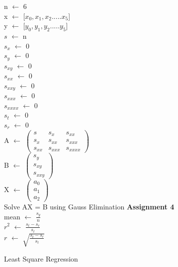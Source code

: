 \documentclass[titlepage, 11pt]{article}
\begin{document}
\begin{center}
\begin{algorithm}[H]\label{alg5}
\SetAlgoLined
{
n $\gets$ 6 \\
x $\gets$ [$x_0,x_1,x_2.....x_{5}$] \\
y $\gets$ [$y_0,y_1,y_2.....y_{5}$] \\
$s$ $\gets$ n \\
$s_x$ $\gets$ 0 \\ 
$s_y$ $\gets$ 0 \\ 
$s_{xy}$ $\gets$ 0 \\ 
$s_{xx}$ $\gets$ 0 \\ 
$s_{xxy}$ $\gets$ 0 \\
$s_{xxx}$ $\gets$ 0 \\
$s_{xxxx}$ $\gets$ 0 \\
$s_t$ $\gets$ 0 \\
$s_r$ $\gets$ 0 \\
A $\gets$
$\begin{pmatrix}
s & s_x & s_{xx}\\
s_x & s_{xx} & s_{xxx} \\
s_{xx} & s_{xxx} & s_{xxxx}
\end{pmatrix}$ \\
B $\gets$
$\begin{pmatrix}
s_y \\
s_{xy} \\
s_{xxy}
\end{pmatrix}$ \\
X $\gets$
$\begin{pmatrix}
a_0 \\
a_1 \\
a_2
\end{pmatrix}$ \\
Solve AX = B using Gauss Elimination \textbf{Assignment 4}\\
mean $\gets$ $\frac{s_y}{n}$ \\
$r^2$ $\gets$ $\frac{s_t-s_r}{s_t}$\\
$r$ $\gets$ $\sqrt{\frac{s_t-s_r}{s_t}}$\\
}
 \caption{Least Square Regression}
\end{algorithm}    
\end{center}
\end{document}
